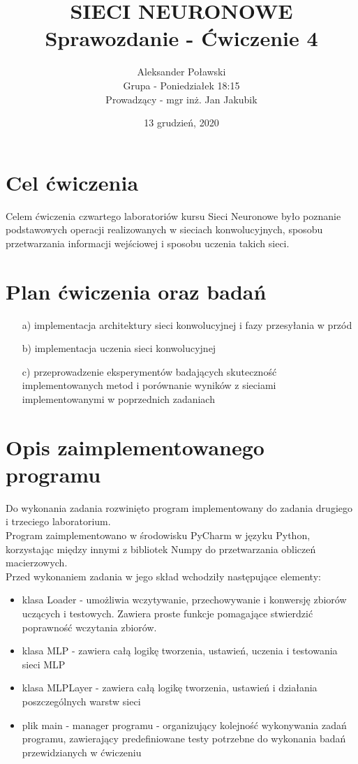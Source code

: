 \documentclass[17pt]{article}
\title{\textbf{SIECI NEURONOWE\\Sprawozdanie - Ćwiczenie 4}}
\author{Aleksander Poławski\\Grupa - Poniedziałek 18:15\\Prowadzący - mgr inż. Jan Jakubik}
\date{13 grudzień, 2020}
\begin{document}
\maketitle	

\section{Cel ćwiczenia}
Celem ćwiczenia czwartego laboratoriów kursu Sieci Neuronowe było poznanie podstawowych operacji realizowanych w sieciach konwolucyjnych, sposobu przetwarzania informacji wejściowej i sposobu uczenia takich sieci.

\section{Plan ćwiczenia oraz badań}

\begin{enumerate}
\item[a)] implementacja architektury sieci konwolucyjnej i fazy przesyłania w przód 

\item[b)] implementacja uczenia sieci konwolucyjnej

\item[c)] przeprowadzenie eksperymentów badających skuteczność implementowanych metod i porównanie wyników z sieciami implementowanymi w poprzednich zadaniach

\end{enumerate}

\section{Opis zaimplementowanego programu}

Do wykonania zadania rozwinięto program implementowany do zadania drugiego i trzeciego laboratorium.\\

Program zaimplementowano w środowisku PyCharm w języku Python, korzystając między innymi z bibliotek Numpy do przetwarzania obliczeń macierzowych.\\

Przed wykonaniem zadania w jego skład wchodziły następujące elementy:
\begin{itemize}
\item klasa Loader - umożliwia wczytywanie, przechowywanie i konwersję zbiorów uczących i testowych. Zawiera proste funkcje pomagające stwierdzić poprawność wczytania zbiorów.
\item klasa MLP - zawiera całą logikę tworzenia, ustawień, uczenia i testowania sieci MLP
\item klasa MLPLayer - zawiera całą logikę tworzenia, ustawień i działania poszczególnych warstw sieci
\item plik main - manager programu - organizujący kolejność wykonywania zadań programu, zawierający predefiniowane testy potrzebne do wykonania badań przewidzianych w ćwiczeniu
\end{itemize}
\end{document}
